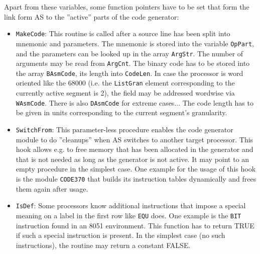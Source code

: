 \documentclass[12pt,twoside]{report}
\newcommand{\tty}[1]{{\tt #1}}
\begin{document}
Apart from these variables, some function pointers have to be set that
form the link form AS to the ''active'' parts of the code
generator:
\begin{itemize}
\item{\tty{MakeCode}: This routine is called after a source line has been
      split into mnemonic and parameters.  The mnemonic is stored into
      the variable \tty{OpPart}, and the parameters can be looked up in the
      array \tty{ArgStr}.  The number of arguments may be read from
      \tty{ArgCnt}.
      The binary code has to be stored into the array \tty{BAsmCode}, its
      length into \tty{CodeLen}.  In case the processor is word oriented
      like the 68000 (i.e. the \tty{ListGran} element corresponding to the
      currently active segment is 2), the field may be addressed
      wordwise via \tty{WAsmCode}.  There is also \tty{DAsmCode} for extreme
      cases... The code length has to be given in units corresponding
      to the current segment's granularity.}
\item{\tty{SwitchFrom}: This parameter-less procedure enables the code generator
      module to do ''cleanups'' when AS switches to another target processor.
      This hook allows e.g. to free memory that has been allocated in the
      generator and that is not needed as long as the generator is not
      active.  It may point to an empty procedure in the simplest case.
      One example for the usage of this hook is the module \tty{CODE370} that
      builds its instruction tables dynamically and frees them again after 
      usage.}
\item{\tty{IsDef}: Some processors know additional instructions that impose
      a special meaning on a label in the first row like \tty{EQU} does.  One 
      example is the \tty{BIT} instruction found in an 8051 environment.  This
      function has to return TRUE if such a special instruction is
      present.  In the simplest case (no such instructions), the routine
      may return a constant FALSE.}
\end{itemize}
\end{document}

